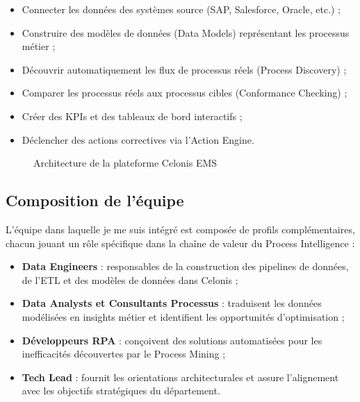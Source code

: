 \begin{itemize}
    \item Connecter les données des systèmes source (SAP, Salesforce, Oracle, etc.) ;
    \item Construire des modèles de données (Data Models) représentant les processus métier ;
    \item Découvrir automatiquement les flux de processus réels (Process Discovery) ;
    \item Comparer les processus réels aux processus cibles (Conformance Checking) ;
    \item Créer des KPIs et des tableaux de bord interactifs ;
    \item Déclencher des actions correctives via l'Action Engine.
\end{itemize}

\begin{figure}[htbp]
    \centering
    \caption{Architecture de la plateforme Celonis EMS}
    \label{fig:celonis_architecture}
\end{figure}

\subsection{Composition de l'équipe}

L'équipe dans laquelle je me suis intégré est composée de profils complémentaires, chacun jouant un rôle spécifique dans la chaîne de valeur du Process Intelligence :

\begin{itemize}
    \item \textbf{Data Engineers} : responsables de la construction des pipelines de données, de l'ETL et des modèles de données dans Celonis ;
    \item \textbf{Data Analysts et Consultants Processus} : traduisent les données modélisées en insights métier et identifient les opportunités d'optimisation ;
    \item \textbf{Développeurs RPA} : conçoivent des solutions automatisées pour les inefficacités découvertes par le Process Mining ;
    \item \textbf{Tech Lead} : fournit les orientations architecturales et assure l'alignement avec les objectifs stratégiques du département.
\end{itemize}

